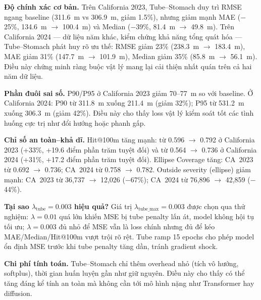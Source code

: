 \documentclass{IEEEtran}
\begin{document}
\textbf{Độ chính xác cơ bản.}
Trên California 2023, Tube--Stomach duy trì RMSE ngang baseline
(311.6~m vs 306.9~m, giảm 1.5\%),
nhưng giảm mạnh MAE ($-$25\%, 134.6~m $\to$ 100.4~m)
và Median ($-$39\%, 81.4~m $\to$ 49.8~m).
Trên California 2024 --- dữ liệu năm khác, kiểm chứng khả năng tổng quát hóa ---
Tube--Stomach phát huy rõ ưu thế:
RMSE giảm 23\% (238.3~m $\to$ 183.4~m),
MAE giảm 31\% (147.7~m $\to$ 101.9~m),
Median giảm 35\% (85.8~m $\to$ 56.1~m).
Điều này chứng minh ràng buộc vật lý mang lại cải thiện nhất quán
trên cả hai năm dữ liệu.

\textbf{Phần đuôi sai số.}
P90/P95 ở California 2023 giảm 70--77~m so với baseline.
Ở California 2024: P90 từ 311.8~m xuống 211.4~m (giảm 32\%);
P95 từ 531.2~m xuống 306.3~m (giảm 42\%).
Điều này cho thấy loss vật lý kiểm soát tốt các tình huống cực trị
như đổi hướng hoặc phanh gấp.

\textbf{Chỉ số an toàn--khả dĩ.}
Hit@100m tăng mạnh: từ 0.596 $\to$ 0.792 ở California 2023
(+33\%, +19.6 điểm phần trăm tuyệt đối)
và từ 0.564 $\to$ 0.736 ở California 2024
(+31\%, +17.2 điểm phần trăm tuyệt đối).
Ellipse Coverage tăng: CA~2023 từ 0.692 $\to$ 0.736;
CA~2024 từ 0.758 $\to$ 0.782.
Outside severity (ellipse) giảm mạnh:
CA~2023 từ 36{,}737 $\to$ 12{,}026 ($-$67\%);
CA~2024 từ 76{,}896 $\to$ 42{,}859 ($-$44\%).

\textbf{Tại sao $\lambda_{\text{tube}}=0.003$ hiệu quả?}
Giá trị $\lambda_{\text{tube\_max}}=0.003$ được chọn qua thử nghiệm:
$\lambda=0.01$ quá lớn khiến MSE bị tube penalty lấn át,
model không hội tụ tối ưu;
$\lambda=0.003$ đủ nhỏ để MSE vẫn là loss chính
nhưng đủ để kéo MAE/Median/Hit@100m vượt trội rõ rệt.
Tube ramp 15 epochs cho phép model ổn định MSE trước khi tube penalty tăng dần,
tránh gradient shock.

\textbf{Chi phí tính toán.}
Tube--Stomach chỉ thêm overhead nhỏ (tích vô hướng, softplus),
thời gian huấn luyện gần như giữ nguyên.
Điều này cho thấy có thể tăng đáng kể tính an toàn mà không cần tới
mô hình nặng như Transformer hay diffusion.
\end{document}
